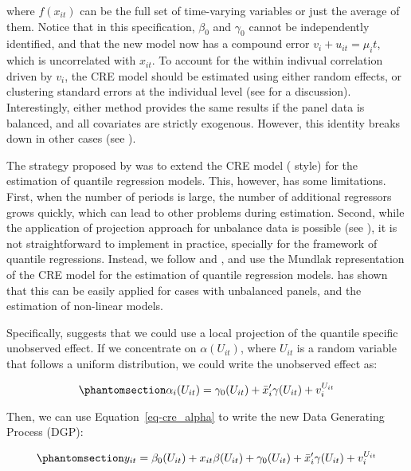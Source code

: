 \documentclass[bib]{statapress}
\begin{document}
where \(f(x_{it})\) can be the full set of time-varying variables or
just the average of them. Notice that in this specification, \(\beta_0\)
and \(\gamma_0\) cannot be independently identified, and that the new
model now has a compound error \(v_i + u_{it}=\mu_it\), which is
uncorrelated with \(x_{it}\). To account for the within indivual
correlation driven by \(v_i\), the CRE model should be estimated using
either random effects, or clustering standard errors at the individual
level (see \citet{wooldridge2010} for a discussion). Interestingly,
either method provides the same results if the panel data is balanced,
and all covariates are strictly exogenous. However, this identity breaks
down in other cases (see \citet{abrevaya2013}).

The strategy proposed by \citet{abrevaya2008} was to extend the CRE
model (\citet{chamberlain1982} style) for the estimation of quantile
regression models. This, however, has some limitations. First, when the
number of periods is large, the number of additional regressors grows
quickly, which can lead to other problems during estimation. Second,
while the application of \citet{chamberlain1982} projection approach for
unbalance data is possible (see \citet{abrevaya2013}), it is not
straightforward to implement in practice, specially for the framework of
quantile regressions. Instead, we follow \citet{wooldridge2010} and
\citet{wooldridge2019}, and use the Mundlak representation of the CRE
model for the estimation of quantile regression models.
\citet{wooldridge2019} has shown that this can be easily applied for
cases with unbalanced panels, and the estimation of non-linear models.

Specifically, \citet{wooldridge2010} suggests that we could use a local
projection of the quantile specific unobserved effect. If we concentrate
on \(\alpha(U_{it})\), where \(U_{it}\) is a random variable that
follows a uniform distribution, we could write the unobserved effect as:

\begin{equation}\phantomsection\label{eq-cre_alpha}{\alpha_i(U_{it})=\gamma_0(U_{it})+\bar x_i'\gamma(U_{it}) + v^{U_{it}}_i
}\end{equation}

Then, we can use Equation~\ref{eq-cre_alpha} to write the new Data
Generating Process (DGP):

\begin{equation}\phantomsection\label{eq-cre-dgp}{y_{it} = \beta_0(U_{it}) + x_{it}\beta(U_{it}) + \gamma_0(U_{it}) + \bar x_i'\gamma(U_{it}) + v^{U_{it}}_i 
}\end{equation}
\end{document}
